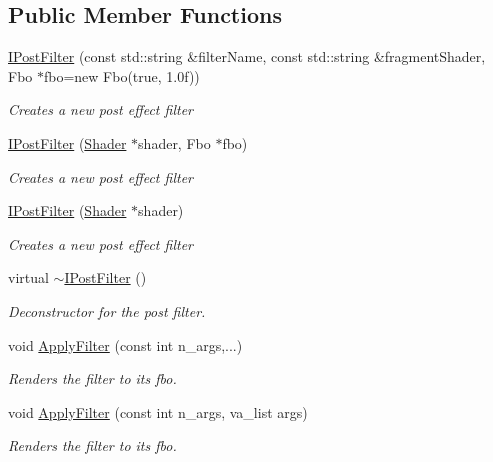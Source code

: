 \subsection*{Public Member Functions}
\begin{DoxyCompactItemize}
\item 
\hyperlink{class_flounder_1_1_i_post_filter_a5a145e57372c65d47af3c8c6f45feb76}{I\+Post\+Filter} (const std\+::string \&filter\+Name, const std\+::string \&fragment\+Shader, Fbo $\ast$fbo=new Fbo(true, 1.\+0f))
\begin{DoxyCompactList}\small\item\em Creates a new post effect filter \end{DoxyCompactList}\item 
\hyperlink{class_flounder_1_1_i_post_filter_ab65fc745b64181b76e30f0b5f1f959f1}{I\+Post\+Filter} (\hyperlink{class_flounder_1_1_shader}{Shader} $\ast$shader, Fbo $\ast$fbo)
\begin{DoxyCompactList}\small\item\em Creates a new post effect filter \end{DoxyCompactList}\item 
\hyperlink{class_flounder_1_1_i_post_filter_af153499061464fdc9e19814f1fd755c4}{I\+Post\+Filter} (\hyperlink{class_flounder_1_1_shader}{Shader} $\ast$shader)
\begin{DoxyCompactList}\small\item\em Creates a new post effect filter \end{DoxyCompactList}\item 
virtual \hyperlink{class_flounder_1_1_i_post_filter_a2aed88c344d7357253b85e107f92bd59}{$\sim$\+I\+Post\+Filter} ()
\begin{DoxyCompactList}\small\item\em Deconstructor for the post filter. \end{DoxyCompactList}\item 
void \hyperlink{class_flounder_1_1_i_post_filter_a81ba69d6b7e70d120db82b9e8ed6a22a}{Apply\+Filter} (const int n\+\_\+args,...)
\begin{DoxyCompactList}\small\item\em Renders the filter to its fbo. \end{DoxyCompactList}\item 
void \hyperlink{class_flounder_1_1_i_post_filter_a634481cffc144c76c4e422c89c1f331a}{Apply\+Filter} (const int n\+\_\+args, va\+\_\+list args)
\begin{DoxyCompactList}\small\item\em Renders the filter to its fbo. \end{DoxyCompactList}\item 

\end{DoxyCompactItemize}
